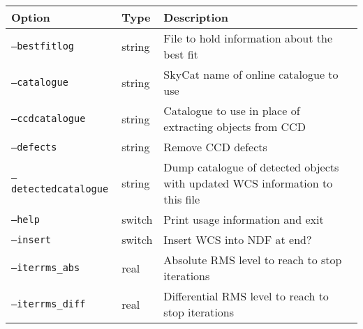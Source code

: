 \documentclass[twoside,11pt,nolof]{starlink}
\begin{document}
\begin{table}
\begin{center}
\begin{tabular}{l|l|p{8cm}}
Option & Type & Description \\ \hline
\texttt{--bestfitlog} & string & File to hold information about the best fit \\
\texttt{--catalogue} & string & SkyCat name of online catalogue to use \\
\texttt{--ccdcatalogue} & string & Catalogue to use in place of extracting
objects from CCD \\
\texttt{--defects} & string & Remove CCD defects \\
\texttt{--detectedcatalogue} & string & Dump catalogue of detected objects
with updated WCS information to this file \\
\texttt{--help} & switch & Print usage information and exit \\
\texttt{--insert} & switch & Insert WCS into NDF at end? \\
\texttt{--iterrms\_abs} & real & Absolute RMS level to reach to stop iterations
\\
\texttt{--iterrms\_diff} & real & Differential RMS level to reach to stop
iterations \\


\end{tabular}
\end{center}
\end{table}
\end{document}
